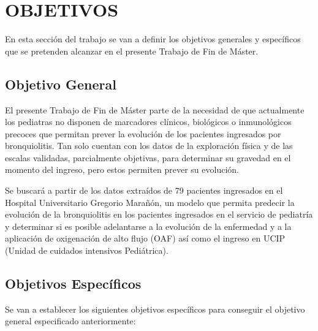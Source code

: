 \section{OBJETIVOS}\label{sec:objectives}

En esta sección del trabajo se van a definir los objetivos generales y específicos que se pretenden alcanzar en el presente Trabajo de Fin de Máster. 

\subsection{Objetivo General}

El presente Trabajo de Fin de Máster parte de la necesidad de que actualmente los pediatras no disponen de marcadores clínicos, biológicos o inmunológicos precoces que permitan prever la evolución de los pacientes ingresados por bronquiolitis. Tan solo cuentan con los datos de la exploración física y de las escalas validadas, parcialmente objetivas, para determinar su gravedad en el momento del ingreso, pero estos permiten prever su evolución. 

Se buscará a partir de los datos extraídos de 79 pacientes ingresados en el Hospital Universitario Gregorio Marañón, un modelo que permita predecir la evolución de la bronquiolitis en los pacientes ingresados en el servicio de pediatría y determinar si es posible adelantarse a la evolución de la enfermedad y a la aplicación de oxigenación de alto flujo (OAF) así como el ingreso en UCIP (Unidad de cuidados intensivos Pediátrica).

\subsection{Objetivos Específicos}

Se van a establecer los siguientes objetivos específicos para conseguir el objetivo general especificado anteriormente:

